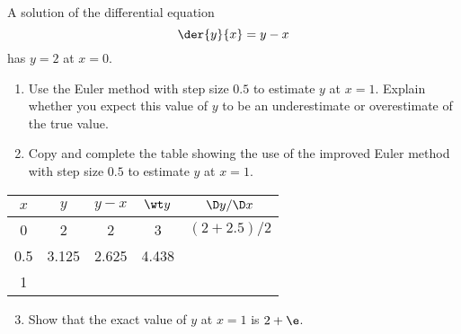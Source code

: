 \begin{problem}
    A solution of the differential equation \[\der{y}{x} = y - x\] has $y = 2$ at $x = 0$.
    \begin{enumerate}
        \item Use the Euler method with step size $0.5$ to estimate $y$ at $x = 1$. Explain whether you expect this value of $y$ to be an underestimate or overestimate of the true value.
        \item Copy and complete the table showing the use of the improved Euler method with step size $0.5$ to estimate $y$ at $x = 1$.
    \end{enumerate}
    \begin{table}[H]
        \centering
        \begin{tabular}{|c|c|c|c|c|}
        \hline
        $x$ & $y$ & $y-x$ & $\wt y$ & $\D y / \D x$ \\ \hline\hline
        0 & 2 & 2 & 3 & $(2 + 2.5)/2$\\ \hline
        0.5 & 3.125 & 2.625 & 4.438 & \\ \hline
        1 & & \cellcolor{black!10} & \cellcolor{black!10} & \cellcolor{black!10}\\\hline
        \end{tabular}
    \end{table}
    \begin{enumerate}
        \setcounter{enumi}{2}
        \item Show that the exact value of $y$ at $x = 1$ is $2 + \e$.
    \end{enumerate}
\end{problem}
